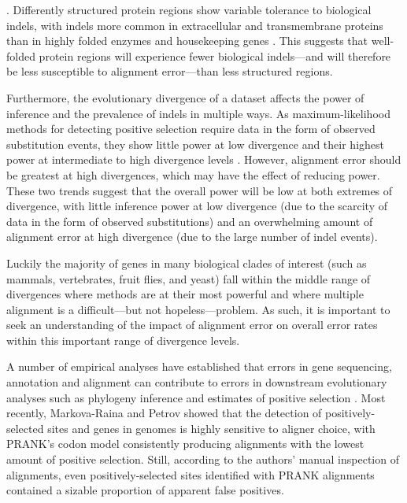 . Differently structured protein regions show
  variable tolerance to biological indels, with indels more common in
  extracellular and transmembrane proteins than in highly folded
  enzymes and housekeeping genes \citep{delaChaux2007DNA}. This
  suggests that well-folded protein regions will experience fewer
  biological indels---and will therefore be less susceptible to
  alignment error---than less structured regions.

Furthermore, the evolutionary divergence of a dataset affects the
power of \sw inference and the prevalence of indels in multiple
ways. As maximum-likelihood methods for detecting positive selection
require data in the form of observed substitution events, they show
little power at low divergence and their highest power at intermediate
to high divergence levels \citep{Anisimova2001Accuracy}. However,
alignment error should be greatest at high divergences, which may have
the effect of reducing power. These two trends suggest that the
overall power will be low at both extremes of divergence, with little
inference power at low divergence (due to the scarcity of data in the
form of observed substitutions) and an overwhelming amount of
alignment error at high divergence (due to the large number of indel
events).

Luckily the majority of genes in many biological clades of interest
(such as mammals, vertebrates, fruit flies, and yeast) fall within the
middle range of divergences where \sw methods are at their most
powerful and where multiple alignment is a difficult---but not
hopeless---problem. As such, it is important to seek an understanding
of the impact of alignment error on overall error rates within this
important range of divergence levels.

A number of empirical analyses have established that errors in gene
sequencing, annotation and alignment can contribute to errors in
downstream evolutionary analyses such as phylogeny inference
\citep{Wong2008Alignment} and estimates of positive selection
\citep{Schneider2009Estimates,Markova-Raina2011High}. Most recently,
Markova-Raina and Petrov \citeyearpar{Markova-Raina2011High} showed
that the detection of positively-selected sites and genes in \Dr
genomes is highly sensitive to aligner choice, with PRANK's codon
model \citep{Loytynoja2008PhylogenyAware} consistently producing
alignments with the lowest amount of positive selection. Still,
according to the authors' manual inspection of alignments, even
positively-selected sites identified with PRANK alignments contained a
sizable proportion of apparent false positives.

